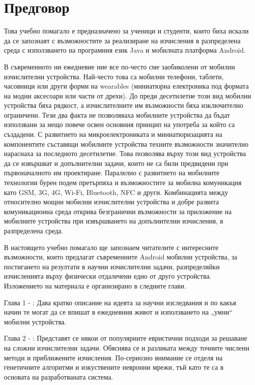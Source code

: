 \newpage
{}
\chapter*{Предговор}

Това учебно помагало е предназначено за ученици и студенти, които биха искали да се запознаят с възможностите за реализиране на изчисления в разпределена среда с използването на програмния език Java и мобилната платформа Android.

В съвременното ни ежедневие ние все по-често сме заобиколени от мобилни изчислителни устройства. Най-често това са мобилни телефони, таблети, часовници или други форми на wearables (миниатюрна електроника под формата на модни аксесоари или части от дрехи). До преди десетилетие този вид мобилни устройства бяха рядкост, а изчислителните им възможности бяха изключително ограничени. Тези два факта не позволяваха мобилните устройства да бъдат използвани за нещо повече освен основния принцип на употреба за който са създадени. С развитието на микроелектрониката и миниатюризацията на компонентите съставящи мобилните устройства техните възможности значително нараснаха за последното десетилетие. Това позволява върху този вид устройства да се извършват и допълнителни задачи, които не са били предвидени при първоначалното им проектиране. Паралелно с развитието на мобилните технологии бурен подем претърпяха и възможностите за мобилна комуникация като GSM, 3G, 4G, Wi-Fi, Bluetooth, NFC и други. Комбинацията между относително мощни мобилни изчислителни устройства и добре развита комуникационна среда открива безгранични възможности за приложение на мобилните устройства при извършването на допълнителни изчисления, в разпределена среда. 

В настоящето учебно помагало ще запознаем читателите с интересните възможности, които предлагат съвременните Android мобилни устройства, за постигането на резултати в научни изчислителни задачи, разпределяйки изчисленията върху физически отдалечени едно от друго устройства. Изложението на материала е организирано в следните глави. 

Глава 1 - : Дава кратко описание на идеята за научни изследвания и по какъв начин те могат да се впишат в ежедневния живот и използването на „умни“ мобилни устройства.

Глава 2 - : Представят се някои от популярните евристични подходи за решаване на сложни изчислителни задачи. Обяснява се и разликата между точните числени методи и приближените изчисления. По-сериозно внимание се отделя на генетичните алгоритми и изкуствените невронни мрежи, тъй като те са в основата на разработваната система. 

